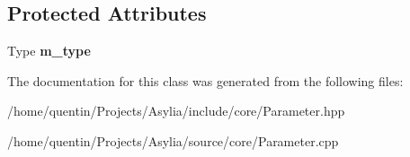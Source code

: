 \subsection*{Protected Attributes}
\begin{DoxyCompactItemize}
\item 
\hypertarget{classParameter_a088830b8d164206cface0a89af79f108}{Type {\bfseries m\-\_\-type}}\label{classParameter_a088830b8d164206cface0a89af79f108}

\end{DoxyCompactItemize}


The documentation for this class was generated from the following files\-:\begin{DoxyCompactItemize}
\item 
/home/quentin/\-Projects/\-Asylia/include/core/Parameter.\-hpp\item 
/home/quentin/\-Projects/\-Asylia/source/core/Parameter.\-cpp\end{DoxyCompactItemize}
